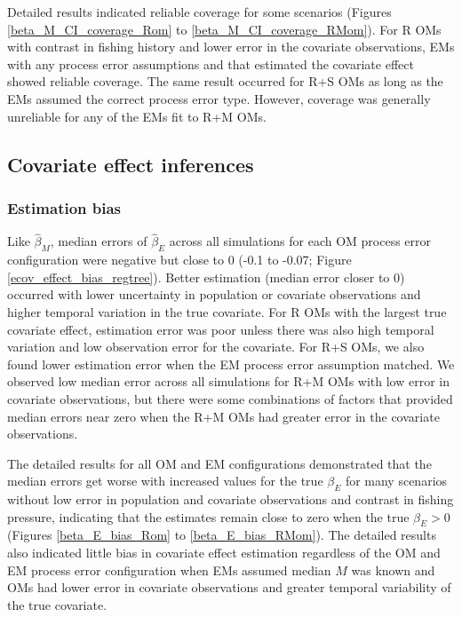\documentclass[
  12pt,
]{article}
\begin{document}
Detailed results indicated reliable coverage for some scenarios (Figures
\ref{beta_M_CI_coverage_Rom} to \ref{beta_M_CI_coverage_RMom}). For R
OMs with contrast in fishing history and lower error in the covariate
observations, EMs with any process error assumptions and that estimated
the covariate effect showed reliable coverage. The same result occurred
for R+S OMs as long as the EMs assumed the correct process error type.
However, coverage was generally unreliable for any of the EMs fit to R+M
OMs.

\subsection*{Covariate effect
inferences}\label{covariate-effect-inferences}

\subsubsection*{Estimation bias}\label{estimation-bias-1}

Like \(\widehat \beta_M\), median errors of \(\widehat \beta_E\) across
all simulations for each OM process error configuration were negative
but close to 0 (-0.1 to -0.07; Figure \ref{ecov_effect_bias_regtree}).
Better estimation (median error closer to 0) occurred with lower
uncertainty in population or covariate observations and higher temporal
variation in the true covariate. For R OMs with the largest true
covariate effect, estimation error was poor unless there was also high
temporal variation and low observation error for the covariate. For R+S
OMs, we also found lower estimation error when the EM process error
assumption matched. We observed low median error across all simulations
for R+M OMs with low error in covariate observations, but there were
some combinations of factors that provided median errors near zero when
the R+M OMs had greater error in the covariate observations.

The detailed results for all OM and EM configurations demonstrated that
the median errors get worse with increased values for the true
\(\beta_E\) for many scenarios without low error in population and
covariate observations and contrast in fishing pressure, indicating that
the estimates remain close to zero when the true \(\beta_E>0\) (Figures
\ref{beta_E_bias_Rom} to \ref{beta_E_bias_RMom}). The detailed results
also indicated little bias in covariate effect estimation regardless of
the OM and EM process error configuration when EMs assumed median \(M\)
was known and OMs had lower error in covariate observations and greater
temporal variability of the true covariate.
\end{document}
